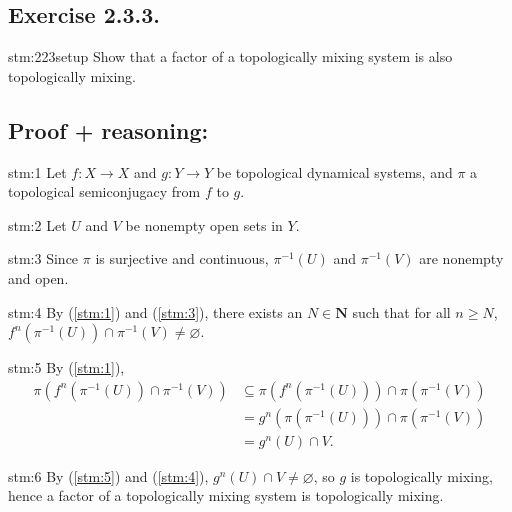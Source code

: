 \subsection*{Exercise 2.3.3.}

\begin{exercise}{stm:223setup}
Show that a factor of a topologically mixing system is also topologically mixing.
\end{exercise}

\subsection*{Proof {\color{blue}+ reasoning}:}

\begin{statement}{stm:1}
Let $f : X \to X$ and $g : Y \to Y$ be topological dynamical systems, and $\pi$ a topological semiconjugacy from $f$ to $g$.
\end{statement}

\begin{statement}{stm:2}
Let $U$ and $V$ be nonempty open sets in $Y$.
\end{statement}

\begin{statement}{stm:3}
Since $\pi$ is surjective and continuous, $\pi^{-1}(U)$ and $\pi^{-1}(V)$ are nonempty and open.
\end{statement}

\begin{statement}{stm:4}
By (\ref{stm:1}) and (\ref{stm:3}), there exists an $N \in \mathbf{N}$ such that for all $n \geq N$, $f^n(\pi^{-1}(U)) \cap \pi^{-1}(V) \neq \varnothing$.
\end{statement}

\begin{statement}{stm:5}
By (\ref{stm:1}), 
\begin{align*}
\pi\left(f^n(\pi^{-1}(U)) \cap \pi^{-1}(V)\right) 
&\subseteq \pi(f^n(\pi^{-1}(U))) \cap \pi(\pi^{-1}(V)) \\
&= g^n(\pi(\pi^{-1}(U))) \cap \pi(\pi^{-1}(V)) \\
&= g^n(U) \cap V.
\end{align*}
\end{statement}

\begin{statement}{stm:6}
By (\ref{stm:5}) and (\ref{stm:4}), $g^n(U) \cap V \neq \varnothing$, so $g$ is topologically mixing, hence a factor of a topologically mixing system is topologically mixing.
\end{statement}

